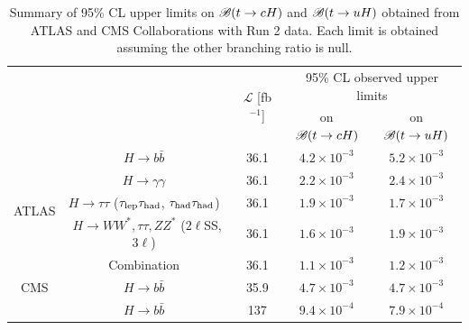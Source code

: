 \documentclass[PAPER, coverpage, atlasdraft=true, texlive=2016, UKenglish]{\ATLASLATEXPATH atlasdoc} %
\begin{document}
\begin{table}[t!]
\caption{\small{Summary of 95\% CL upper limits on $\mathscr{B}(t \to cH)$ and $\mathscr{B}(t \to uH)$ obtained from ATLAS and CMS Collaborations with Run 2 data. Each limit is obtained assuming the other branching ratio is null.}}
\begin{center}
\small 
\begin{tabular}{ccccc}
\toprule\toprule
& &\multirow{2}{*}{$\mathcal{L}$ [fb$^{-1}$]} & \multicolumn{2}{c}{95\% CL observed upper limits}  \\
& & 										    & \multicolumn{1}{c}{on $\mathscr{B}(t \to cH)$}            & \multicolumn{1}{c}{on $\mathscr{B}(t \to uH)$} \\
\midrule
\multirow{5}{*}{ATLAS}
& $H \to b\bar{b}$~\cite{fcnc36}                                          & 36.1         & $4.2 \times 10^{-3}$ & $5.2 \times 10^{-3}$ \\
& $H \to \gamma\gamma$~\cite{Aaboud:2017mfd}                              & 36.1         & $2.2 \times 10^{-3}$  & $2.4 \times 10^{-3}$  \\
& $H \to \tau\tau$ ($\tau_{\mathrm{lep}} \tau_{\mathrm{had}}$, $\tau_{\mathrm{had}} \tau_{\mathrm{had}}$)~\cite{fcnc36}                   & 36.1         & $1.9 \times 10^{-3}$  & $1.7 \times 10^{-3}$  \\ 
& $H \to WW^*, \tau\tau, ZZ^*$ ($2\ell$SS, $3\ell$)~\cite{Aaboud:2018pob} & 36.1         & $1.6 \times 10^{-3}$  & $1.9 \times 10^{-3}$\\ 
& Combination~\cite{fcnc36}                                               & 36.1         & $1.1 \times 10^{-3}$  & $1.2 \times 10^{-3}$  \\\midrule
\multirow{1}{*}{CMS} 
& $H \to b\bar{b}$~\cite{Sirunyan:2017uae}                                & 35.9         & $4.7 \times 10^{-3}$  & $4.7 \times 10^{-3}$  \\
& $H \to b\bar{b}$~\cite{CMS:2021gfa}                                     & 137          & $9.4 \times 10^{-4}$  & $7.9 \times 10^{-4}$  \\
% 
\bottomrule\bottomrule
\end{tabular}
\label{tab:limits_summary_ref}
\end{center}
\end{table}
\end{document}
